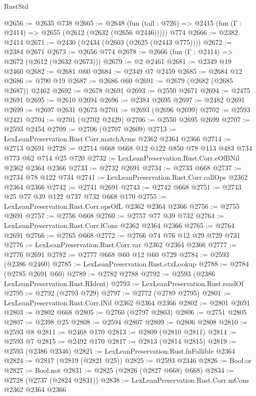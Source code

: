 \begin{lexlean}{RustStd}
\begin{coremodule}
@2656 := @2635 @738
@2665 := @2648
    (fun (tail : @726) => @2415 (fun (Γ : @2414) => @2655 (@2612 (@2632 (@2656 @2446)))))
    @774
@2666 := @2382 @2414
@2671 := @2430 (@2434 (@2603 (@2625 (@2443 @775))))
@2672 := @2384 @2671
@2673 := @2656 @774
@2678 := @2666 (fun (Γ : @2414) => @2672 (@2612 (@2632 @2673)))
@2679 := @2 @2461
@2681 := @2349 @19 @2460
@2682 := @2681 @60
@2684 := @2349 @7 @2459
@2685 := @2684 @12
@2686 := @790 @19
@2687 := @2686 @60
@2691 := @2679 (@2682 (@2685 @2687)) @2462
@2692 := @2678 @2691
@2693 := @2550 @2671
@2694 := @2475 @2691
@2695 := @2610 @2694
@2696 := @2384 @2695
@2697 := @2482 @2691
@2699 := @2697 @2631 @2673
@2701 := @2693 (@2696 @2699)
@2702 := @2593 @2421
@2704 := @2701 (@2702 @2429)
@2706 := @2550 @2695 @2699
@2707 := @2593 @2454
@2709 := @2706 (@2707 @2609)
@2713 := LexLeanPreservation.Rust.Corr.matchArms @2362 @2364 @2366
@2714 := @2713 @2691
@2728 := @2714 @668 @668 @12 @122 @850 @78 @113 @483 @734 @773 @62 @714 @25 @720
@2732 := LexLeanPreservation.Rust.Corr.eOfBNil @2362 @2364 @2366
@2733 := @2732 @2691
@2734 := @2733 @668
@2737 := @2734 @78 @122 @734
@2741 := LexLeanPreservation.Rust.Corr.callOps @2362 @2364 @2366
@2742 := @2741 @2691
@2743 := @2742 @668
@2751 := @2743 @25 @77 @39 @122 @737 @732 @668 @170
@2755 := LexLeanPreservation.Rust.Corr.opsOfL @2362 @2364 @2366
@2756 := @2755 @2691
@2757 := @2756 @668
@2760 := @2757 @77 @39 @732
@2764 := LexLeanPreservation.Rust.Corr.lCons @2362 @2364 @2366
@2765 := @2764 @2691
@2766 := @2765 @668
@2772 := @2766 @74 @76 @12 @29 @729 @731
@2776 := LexLeanPreservation.Rust.Corr.var @2362 @2364 @2366
@2777 := @2776 @2691
@2782 := @2777 @668 @60 @12 @60 @729
@2784 := @2593 (@2386 @2460)
@2785 := LexLeanPreservation.Rust.ctxLookup
@2788 := @2784 (@2785 @2691 @60)
@2789 := @2782 @2788
@2792 := @2593 (@2386 LexLeanPreservation.Rust.RIdent)
@2793 := LexLeanPreservation.Rust.readOf
@2795 := @2792 (@2793 @729)
@2797 := @2772 (@2789 @2795)
@2801 := LexLeanPreservation.Rust.Corr.lNil @2362 @2364 @2366
@2802 := @2801 @2691
@2803 := @2802 @668
@2805 := @2760 (@2797 @2803)
@2806 := @2751 @2805
@2807 := @2398 @25
@2808 := @2594 @2807
@2809 := @2806 @2808
@2810 := @2593 @8
@2811 := @2468 @170
@2813 := @2809 (@2810 @2811)
@2814 := @2593 @7
@2815 := @2492 @170
@2817 := @2813 (@2814 @2815)
@2819 := @2593 (@2386 @2346)
@2821 := LexLeanPreservation.Rust.fnFallible @2364
@2824 := @2817 (@2819 (@2821 @25))
@2825 := @2593 @2346
@2826 := Bool.or
@2827 := Bool.not
@2831 := @2825 (@2826 (@2827 @668) @668)
@2834 := @2728 (@2737 (@2824 @2831))
@2838 := LexLeanPreservation.Rust.Corr.mCons @2362 @2364 @2366

\end{coremodule}
\end{lexlean}
